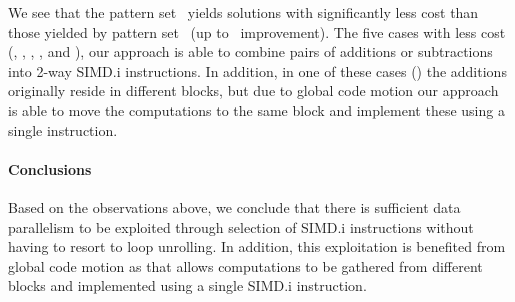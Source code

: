 We see that the \gls{pattern set}~ yields \glspl{solution}
with significantly less cost than those yielded by \gls{pattern
  set}~ (up to~\printSpeedup{%
  \SimdVsWithoutCyclesSpeedupCyclesZeroCenteredSpeedupMax%
} improvement).
%
The five cases with less cost (,
, , , and
), our approach is able to combine pairs of additions or
subtractions into \num{2}-way \gls{SIMD.i} \glspl{instruction}.
%
In addition, in one of these cases () the additions
originally reside in different \glspl{block}, but due to \gls{global code
  motion} our approach is able to move the computations to the same \gls{block}
and implement these using a single \gls{instruction}.


\paragraph{Conclusions}

Based on the observations above, we conclude that there is sufficient data
parallelism to be exploited through selection of \gls{SIMD.i}
\glspl{instruction} without having to resort to \gls{loop unrolling}.
%
In addition, this exploitation is benefited from \gls{global code motion} as
that allows computations to be gathered from different \glspl{block} and
implemented using a single \gls{SIMD.i} \gls{instruction}.
